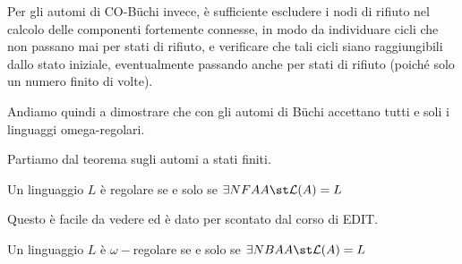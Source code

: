 Per gli automi di CO-Büchi invece, è sufficiente escludere i nodi di rifiuto nel calcolo delle componenti fortemente connesse, in modo da individuare cicli che non passano mai per stati di rifiuto, e verificare che tali cicli siano raggiungibili dallo stato iniziale, eventualmente passando anche per stati di rifiuto (poiché solo un numero finito di volte).

Andiamo quindi a dimostrare che con gli automi di Büchi accettano tutti e soli i linguaggi omega-regolari.

Partiamo dal teorema sugli automi a stati finiti.

\begin{theorem}
  Un linguaggio \(L\) è regolare se e solo se \(\exists NFA A \st \mathcal{L}(A) = L\)
\end{theorem}

Questo è facile da vedere ed è dato per scontato dal corso di EDIT.

\begin{theorem}
  Un linguaggio \(L\) è \(\omega-\)regolare se e solo se \(\exists NBA A \st \mathcal{L}(A) = L\)
\end{theorem}


